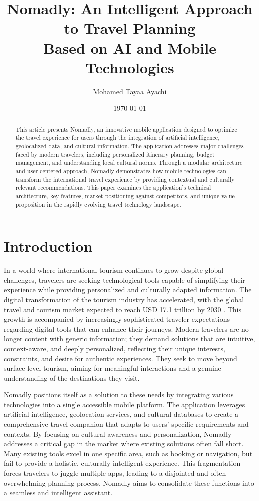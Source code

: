 \documentclass[11pt, a4paper]{article}
\title{\LARGE \textbf{Nomadly: An Intelligent Approach to Travel Planning\\Based on AI and Mobile Technologies}}
\author{Mohamed Tayaa Ayachi}
\date{\today} %
\begin{document}
\maketitle %

\begin{abstract}
\noindent %
This article presents Nomadly, an innovative mobile application designed to optimize the travel experience for users through the integration of artificial intelligence, geolocalized data, and cultural information. The application addresses major challenges faced by modern travelers, including personalized itinerary planning, budget management, and understanding local cultural norms. Through a modular architecture and user-centered approach, Nomadly demonstrates how mobile technologies can transform the international travel experience by providing contextual and culturally relevant recommendations. This paper examines the application's technical architecture, key features, market positioning against competitors, and unique value proposition in the rapidly evolving travel technology landscape.
\end{abstract}

\section{Introduction}

In a world where international tourism continues to grow despite global challenges, travelers are seeking technological tools capable of simplifying their experience while providing personalized and culturally adapted information. The digital transformation of the tourism industry has accelerated, with the global travel and tourism market expected to reach USD 17.1 trillion by 2030 \citep{unwto2023}. This growth is accompanied by increasingly sophisticated traveler expectations regarding digital tools that can enhance their journeys. Modern travelers are no longer content with generic information; they demand solutions that are intuitive, context-aware, and deeply personalized, reflecting their unique interests, constraints, and desire for authentic experiences. They seek to move beyond surface-level tourism, aiming for meaningful interactions and a genuine understanding of the destinations they visit.

Nomadly positions itself as a solution to these needs by integrating various technologies into a single accessible mobile platform. The application leverages artificial intelligence, geolocation services, and cultural databases to create a comprehensive travel companion that adapts to users' specific requirements and contexts. By focusing on cultural awareness and personalization, Nomadly addresses a critical gap in the market where existing solutions often fall short. Many existing tools excel in one specific area, such as booking or navigation, but fail to provide a holistic, culturally intelligent experience. This fragmentation forces travelers to juggle multiple apps, leading to a disjointed and often overwhelming planning process. Nomadly aims to consolidate these functions into a seamless and intelligent assistant.
\end{document}
